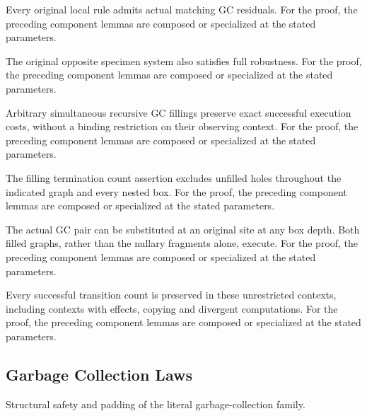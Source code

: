 Every original local rule admits actual matching GC residuals.
For the proof, the preceding component lemmas are composed or specialized at the stated parameters.
\par{}

The original opposite specimen system also satisfies full robustness.
For the proof, the preceding component lemmas are composed or specialized at the stated parameters.
\par{}

Arbitrary simultaneous recursive GC fillings preserve exact successful execution costs, without a binding restriction on their observing context.
For the proof, the preceding component lemmas are composed or specialized at the stated parameters.
\par{}

The filling termination count assertion excludes unfilled holes throughout the indicated graph and every nested box.
For the proof, the preceding component lemmas are composed or specialized at the stated parameters.
\par{}

The actual GC pair can be substituted at an original site at any box depth. Both filled graphs, rather than the nullary fragments alone, execute.
For the proof, the preceding component lemmas are composed or specialized at the stated parameters.
\par{}

Every successful transition count is preserved in these unrestricted contexts, including contexts with effects, copying and divergent computations.
For the proof, the preceding component lemmas are composed or specialized at the stated parameters.
\par{}

\subsection{Garbage Collection Laws}
Structural safety and padding of the literal garbage-collection family.

